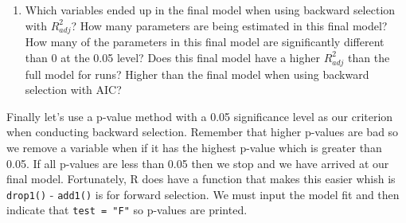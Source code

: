 \documentclass[]{book}
\providecommand{\tightlist}{%
  \setlength{\itemsep}{0pt}\setlength{\parskip}{0pt}}
\theoremstyle{definition}
\theoremstyle{definition}
\theoremstyle{definition}
\theoremstyle{remark}
\begin{document}
\begin{enumerate}
\def\labelenumi{\arabic{enumi}.}
\setcounter{enumi}{2}
\tightlist
\item
  Which variables ended up in the final model when using backward
  selection with \(R^2_{adj}\)? How many parameters are being estimated
  in this final model? How many of the parameters in this final model
  are significantly different than 0 at the 0.05 level? Does this final
  model have a higher \(R^2_{adj}\) than the full model for runs? Higher
  than the final model when using backward selection with AIC?
\end{enumerate}

Finally let's use a p-value method with a 0.05 significance level as our
criterion when conducting backward selection. Remember that higher
p-values are bad so we remove a variable when if it has the highest
p-value which is greater than 0.05. If all p-values are less than 0.05
then we stop and we have arrived at our final model. Fortunately, R does
have a function that makes this easier whish is \texttt{drop1()} -
\texttt{add1()} is for forward selection. We must input the model fit
and then indicate that \texttt{test\ =\ "F"} so p-values are printed.
\end{document}
